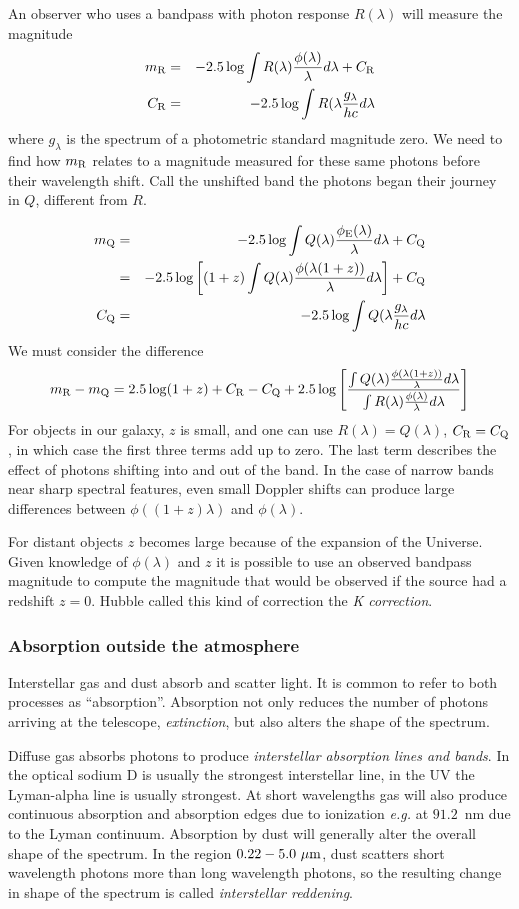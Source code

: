 \documentclass{article}
\newcommand{\bua}{\begin{eqnarray*}}
\newcommand{\eua}{\end{eqnarray*}}
\begin{document}
An observer who uses a bandpass with photon response $R(\lambda)$ will
measure the magnitude
\bua
m_{\rm R}&=&-2.5\log
{ \int R(\lambda)\frac{\phi(\lambda)}{\lambda}d\lambda}+C_{\rm R} \\
C_{\rm R}&=&-2.5\log{\int   R(\lambda\frac{g_\lambda}{hc}d\lambda}
\eua
where $g_\lambda$ is the spectrum of a photometric standard magnitude
zero. We need to find how $m_{\rm R}$ relates to a magnitude measured
for these same photons before their wavelength shift. Call the
unshifted band the photons began their journey in $Q$, different from $R$.

\bua
m_{\rm Q}&=&-2.5\log{\int
  Q(\lambda)\frac{\phi_{\rm E}(\lambda)}{\lambda}d\lambda}+C_{\rm Q} \\
                &=&-2.5\log\left[{(1+z)\int
                    Q(\lambda)\frac{\phi(\lambda(1+z))}{\lambda}d\lambda}\right]+C_{\rm
                  Q} \\
C_{\rm Q}&=&-2.5\log{\int   Q(\lambda\frac{g_\lambda}{hc}d\lambda}
\eua
We must consider the difference
\[
m_{\rm R}-m_{\rm Q}=2.5\log(1+z)
+C_{\rm R}-C_{\rm Q}+2.5\log\left[
  \frac{\int  Q(\lambda)\frac{\phi(\lambda(1+z))}{\lambda}d\lambda}{\int R(\lambda)\frac{\phi(\lambda)}{\lambda}d\lambda}\right]
\]
For objects in our galaxy, $z$ is small, and one can use
$R(\lambda)=Q(\lambda)$, $C_{\rm R}=C_{\rm Q}$, in which case the
first three terms add up to zero. The last term describes the effect
of photons shifting into and out of the band. In the case of narrow
bands near sharp spectral features, even small Doppler shifts can
produce large differences between $\phi((1+z)\lambda)$ and
$\phi(\lambda)$. 

For distant objects $z$ becomes large because of the expansion of the
Universe. Given knowledge of $\phi(\lambda)$ and $z$ it is possible to
use an observed bandpass magnitude to compute the magnitude that
would be observed if the source had a redshift $z=0$. Hubble called
this kind of correction the {\it K correction}. 
\subsubsection{Absorption outside the atmosphere}
Interstellar gas and dust absorb and scatter light. It is common to
refer to both processes as ``absorption''. Absorption not only reduces
the number of photons arriving at the telescope, {\it extinction}, but
also alters the shape of the spectrum.

Diffuse gas absorbs photons to produce {\it interstellar absorption
  lines and bands}. In the optical sodium D is usually the strongest
interstellar line, in the UV the Lyman-alpha line is usually
strongest. At short wavelengths gas will also produce continuous
absorption and absorption edges due to ionization {\it e.g.} at
$91.2$~nm due to the Lyman continuum. Absorption by dust will
generally alter the overall shape of the spectrum. In the region
$0.22-5.0~\mu{\rm m}$, dust scatters short wavelength photons more
than long wavelength photons, so the resulting change in shape of the
spectrum is called {\it interstellar reddening}. 
\end{document}
